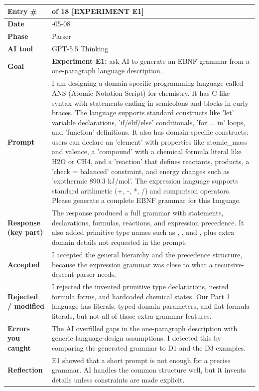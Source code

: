 \documentclass[11pt,a4paper]{article}
\newcommand{\code}[1]{\texttt{\detokenize{#1}}}
\newcommand{\entrygap}{\vspace{8pt}}
\newenvironment{journalentry}{%
  \begin{center}\small\renewcommand{\arraystretch}{1.22}%
  \begin{tabular}{|>{\columncolor{anscodebg}\bfseries}p{3.0cm}|>{\RaggedRight\arraybackslash}p{12.25cm}|}%
  \hline
}{%
  \end{tabular}\end{center}\entrygap
}
\begin{document}
\begin{journalentry}
Entry \# & 11 of 18 [EXPERIMENT E1] \\ \hline
Date & 2026-05-08 \\ \hline
Phase & Parser \\ \hline
AI tool & GPT-5.5 Thinking \\ \hline
Goal & \textbf{Experiment E1:} ask AI to generate an EBNF grammar from a one-paragraph language description. \\ \hline
Prompt & I am designing a domain-specific programming language called ANS (Atomic Notation Script) for chemistry. It has C-like syntax with statements ending in semicolons and blocks in curly braces. The language supports standard constructs like 'let' variable declarations, 'if/elif/else' conditionals, 'for ... in' loops, and 'function' definitions. It also has domain-specific constructs: users can declare an 'element' with properties like atomic\_mass and valence, a 'compound' with a chemical formula literal like H2O or CH4, and a 'reaction' that defines reactants, products, a 'check = balanced' constraint, and energy changes such as 'exothermic 890.3 kJ/mol'. The expression language supports standard arithmetic (+, -, *, /) and comparison operators. Please generate a complete EBNF grammar for this language. \\ \hline
Response (key part) & The response produced a full grammar with statements, declarations, formulas, reactions, and expression precedence. It also added primitive type names such as \code{number}, \code{string}, and \code{bool}, plus extra domain details not requested in the prompt. \\ \hline
Accepted & I accepted the general hierarchy and the precedence structure, because the expression grammar was close to what a recursive-descent parser needs. \\ \hline
Rejected / modified & I rejected the invented primitive type declarations, nested formula forms, and hardcoded chemical states. Our Part 1 language has literals, typed domain parameters, and flat formula literals, but not all of those extra grammar features. \\ \hline
Errors you caught & The AI overfilled gaps in the one-paragraph description with generic language-design assumptions. I detected this by comparing the generated grammar to D1 and the D3 examples. \\ \hline
Reflection & E1 showed that a short prompt is not enough for a precise grammar. AI handles the common structure well, but it invents details unless constraints are made explicit. \\ \hline
\end{journalentry}
\end{document}
